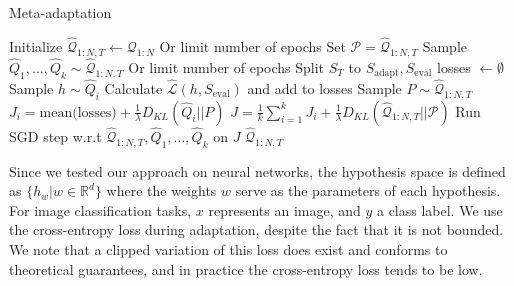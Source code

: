 \documentclass[letterpaper]{article} %
\theoremstyle{definition}
\begin{document}
\begin{algorithm}[H]
	\caption{Meta-adaptation}
	\label{alg1}
	\small
	\begin{algorithmic}
		\State Initialize $\hat{\mathcal{Q}}_{1:N, T}\leftarrow \mathcal{Q}_{1:N}$
		 \Comment Or limit number of epochs
			\State Set $\mathcal{P}=\hat{\mathcal{Q}}_{1:N, T}$
			\State Sample $\hat{Q}_1,\ldots,\hat{Q}_k\sim \hat{\mathcal{Q}}_{1:N, T}$
			 \Comment Or limit number of epochs
					\State Split $S_T$ to $S_{\mathrm{adapt}},S_{\mathrm{eval}}$
					\State losses $\leftarrow \emptyset$
						\State Sample $h\sim \hat{Q}_i$
						\State Calculate $\hat{\mathcal{L}}(h,S_{\mathrm{eval}})$ and add to losses
					\EndFor 
					\State Sample $P\sim \hat{\mathcal{Q}}_{1:N, T}$
					\State $J_i=\textrm{mean(losses)}+\frac{1}{\lambda} D_{KL}(\hat{Q}_i||P)$
				\EndFor
				\State $J=\frac{1}{k}\sum_{i=1}^{k}J_i + \frac{1}{\lambda} D_{KL}(\hat{\mathcal{Q}}_{1:N, T}||\mathcal{P})$
				\State  Run SGD step w.r.t $\hat{\mathcal{Q}}_{1:N, T},\hat{Q}_1,\ldots,\hat{Q}_k$ on $J$
			\EndWhile
		\EndWhile
		\State \Return $\hat{\mathcal{Q}}_{1:N, T}$
		\EndFunction
		
	\end{algorithmic}
\end{algorithm}

Since we tested our approach on neural networks, the hypothesis space is defined as $\{h_w|w\in \mathbb{R}^d\}$ where the weights $w$ serve as the parameters of each hypothesis.
For image classification tasks, $x$ represents an image, and $y$ a class label. 
We use the cross-entropy loss during adaptation, despite the fact that it is not bounded. We note that a clipped variation of this loss does exist and conforms to theoretical guarantees, and in practice the cross-entropy loss tends to be low.
\end{document}
